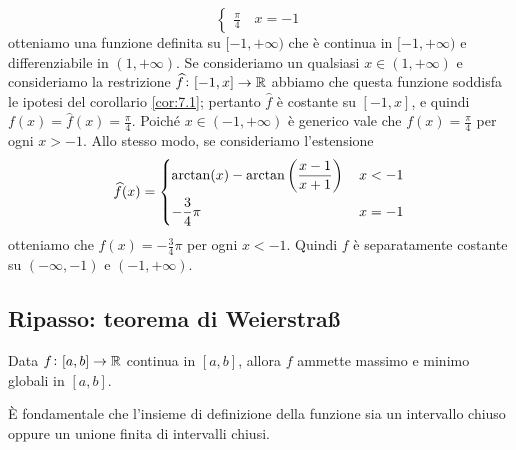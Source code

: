 \begin{remark}
\[\begin{cases}
        \frac{\pi}{4}\, & x=-1
    \end{cases}
    \]
    otteniamo una funzione definita su $[-1,+\infty)$ che è continua in $[-1, +\infty)$ e differenziabile in $(1, +\infty)$. Se consideriamo un qualsiasi $x\in(1,+\infty)$ e consideriamo la restrizione $\widehat{f}\colon [-1, x]\to \amsbb{R}$ abbiamo che questa funzione soddisfa le ipotesi del corollario \ref{cor:7.1}; pertanto $\widehat{f}$ è costante su $[-1, x]$, e quindi $f(x) = \widehat{f}(x) = \frac{\pi}{4}$. Poiché $x\in(-1, +\infty)$ è generico vale che $f(x) = \frac{\pi}{4}$ per ogni $x>-1$. Allo stesso modo, se consideriamo l'estensione
    \[
    \widehat{f}(x) = \begin{dcases}
        \arctan(x)-\arctan\left(\frac{x-1}{x+1}\right)\, & x<-1\\
        -\frac{3}{4}\pi\, & x=-1
    \end{dcases}
    \]
    otteniamo che $f(x)=-\frac{3}{4}\pi$ per ogni $x<-1$. Quindi $f$ è separatamente costante su $(-\infty, -1)$ e $(-1, +\infty)$.
\end{remark}
\subsection{Ripasso: teorema di \texorpdfstring{Weierstra{\ss}}{Weierstraß}}
\begin{theorem}
    \label{th:7.3}
    Data $f\colon[a,b]\to \amsbb{R}$ continua in $[a,b]$, allora $f$ ammette massimo e minimo globali in $[a,b]$.
\end{theorem}
\begin{remark}
    \`E fondamentale che l'insieme di definizione della funzione sia un intervallo chiuso oppure un unione finita di intervalli chiusi.
\end{remark}
